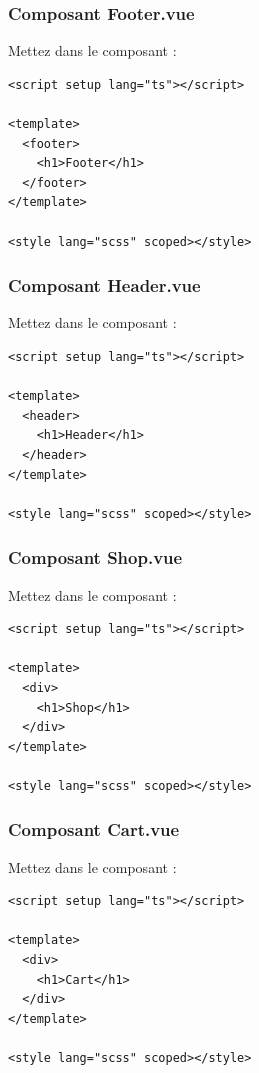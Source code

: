 \subsubsection{Composant {\color{monOrange}Footer.vue}}
Mettez dans le composant :
\begin{verbatim}
<script setup lang="ts"></script>

<template>
  <footer>
    <h1>Footer</h1>
  </footer>
</template>

<style lang="scss" scoped></style>
\end{verbatim}

\subsubsection{Composant {\color{monOrange}Header.vue}}
Mettez dans le composant :
\begin{verbatim}
<script setup lang="ts"></script>

<template>
  <header>
    <h1>Header</h1>
  </header>
</template>

<style lang="scss" scoped></style>
\end{verbatim}

\subsubsection{Composant {\color{monOrange}Shop.vue}}
Mettez dans le composant :
\begin{verbatim}
<script setup lang="ts"></script>

<template>
  <div>
    <h1>Shop</h1>
  </div>
</template>

<style lang="scss" scoped></style>
\end{verbatim}

\subsubsection{Composant {\color{monOrange}Cart.vue}}
Mettez dans le composant :
\begin{verbatim}
<script setup lang="ts"></script>

<template>
  <div>
    <h1>Cart</h1>
  </div>
</template>

<style lang="scss" scoped></style>
\end{verbatim}

